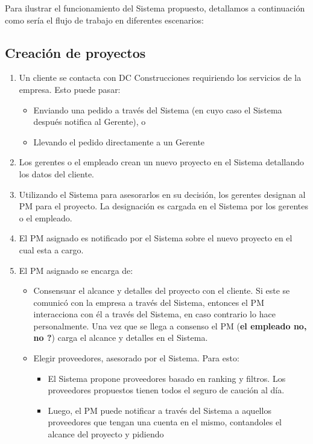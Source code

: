 Para ilustrar el funcionamiento del Sistema propuesto, detallamos a continuación como sería el flujo de trabajo en diferentes escenarios:

\subsection{Creación de proyectos}

\begin{enumerate}
    \item Un cliente se contacta con DC Construcciones requiriendo los servicios de la empresa. Esto puede pasar:
        \begin{itemize}
            \item Enviando una pedido a través del Sistema (en cuyo caso el Sistema después notifica al Gerente), o
            \item Llevando el pedido directamente a un Gerente
        \end{itemize}
    \item Los gerentes o el empleado crean un nuevo proyecto en el Sistema detallando los datos del cliente.
    \item Utilizando el Sistema para asesorarlos en su decisión, los gerentes designan al PM para el proyecto.
        La designación es cargada en el Sistema por los gerentes o el empleado.
    \item El PM asignado es notificado por el Sistema sobre el nuevo proyecto en el cual esta a cargo.
    \item El PM asignado se encarga de:
        \begin{itemize}
            \item Consensuar el alcance y detalles del proyecto con el cliente. Si este se comunicó con la empresa a través del Sistema, entonces el PM interacciona con él a través del Sistema, en caso contrario lo hace personalmente. Una vez que se llega a consenso el PM (\textbf{el empleado no, no ?}) carga el alcance y detalles en el Sistema.
            \item Elegir proveedores, asesorado por el Sistema. Para esto:
                \begin{itemize}
                    \item El Sistema propone proveedores basado en ranking y filtros. Los proveedores propuestos tienen todos el seguro de caución al día.
                    \item Luego, el PM puede notificar a través del Sistema a aquellos proveedores que tengan una cuenta en el mismo, contandoles el alcance del proyecto y pidiendo

\end{itemize}
\end{itemize}
\end{enumerate}
